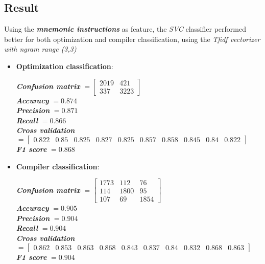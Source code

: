 \documentclass[11pt]{article}
\begin{document}
\subsection{Result}
Using the \textbf{\textit{mnemonic instructions}} as feature, the \textit{SVC} classifier performed better for both optimization and compiler classification, using the \textit{Tfidf vectorizer with ngram range (3,3)}
\begin{itemize}
	\item \textbf{Optimization classification}: \\
	\begin{center}
		\textbf{\textit{Confusion matrix}} $= \begin{bmatrix}
		2019 & 421 \\
		337 & 3223
		\end{bmatrix}$\\
		\textbf{\textit{Accuracy}} $= 0.874$\\
		\textbf{\textit{Precision}} $= 0.871$\\
		\textbf{\textit{Recall}} $= 0.866$\\
		\textbf{\textit{Cross validation}} $= \begin{bmatrix}
		0.822 & 0.85 & 0.825 & 0.827 & 0.825 & 0.857 & 0.858 & 0.845 & 0.84 & 0.822
		\end{bmatrix}$\\
		\textbf{\textit{F1 score}} $= 0.868$
	\end{center}
	
	\item \textbf{Compiler classification}: \\
	\begin{center}
		\textbf{\textit{Confusion matrix}} $= \begin{bmatrix}
		1773 & 112 & 76 \\
		114 & 1800 & 95 \\
		107 & 69 & 1854
		\end{bmatrix}$\\
		\textbf{\textit{Accuracy}} $= 0.905$\\
		\textbf{\textit{Precision}} $= 0.904$\\
		\textbf{\textit{Recall}} $= 0.904$\\
		\textbf{\textit{Cross validation}} $= \begin{bmatrix}
		0.862 & 0.853 & 0.863 & 0.868 & 0.843 & 0.837 & 0.84 & 0.832 & 0.868 & 0.863
		\end{bmatrix}$\\
		\textbf{\textit{F1 score}} $= 0.904$
	\end{center}
\end{itemize}
\end{document}
